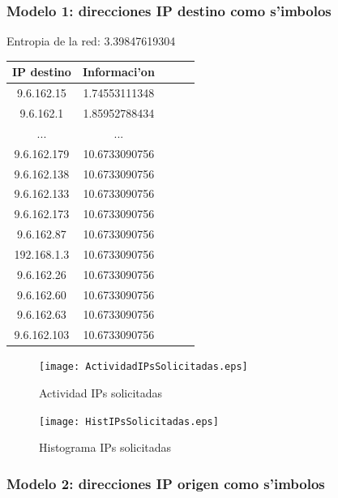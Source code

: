 \documentclass[a4paper,10pt]{article}
\begin{document}
\subsubsection{Modelo 1: direcciones IP destino como s'imbolos}

Entropia de la red: 3.39847619304	\\

\noindent \begin{tabular}{| c | c | c | c | r} \hline
IP destino	&	Informaci'on	\\	\hline
9.6.162.15	 & 	1.74553111348	 \\ \hline 
9.6.162.1	 & 	1.85952788434	 \\ \hline 
...	&	...	\\ \hline
9.6.162.179	 & 	10.6733090756	 \\ \hline 
9.6.162.138	 & 	10.6733090756	 \\ \hline 
9.6.162.133	 & 	10.6733090756	 \\ \hline 
9.6.162.173	 & 	10.6733090756	 \\ \hline 
9.6.162.87	 & 	10.6733090756	 \\ \hline 
192.168.1.3	 & 	10.6733090756	 \\ \hline 
9.6.162.26	 & 	10.6733090756	 \\ \hline 
9.6.162.60	 & 	10.6733090756	 \\ \hline 
9.6.162.63	 & 	10.6733090756	 \\ \hline 
9.6.162.103	 & 	10.6733090756	 \\ \hline 
\end{tabular}

\newpage

\begin{figure}[!hbp]
\begin{center}
\texttt{[image: ActividadIPsSolicitadas.eps]}
\end{center}
\caption{Actividad IPs solicitadas} \label{figura2}
\end{figure}

\begin{figure}[!hbp]
\begin{center}
\texttt{[image: HistIPsSolicitadas.eps]}
\end{center}
\caption{Histograma IPs solicitadas} \label{figura3}
\end{figure}

\newpage

\subsubsection{Modelo 2: direcciones IP origen como s'imbolos}
\end{document}
